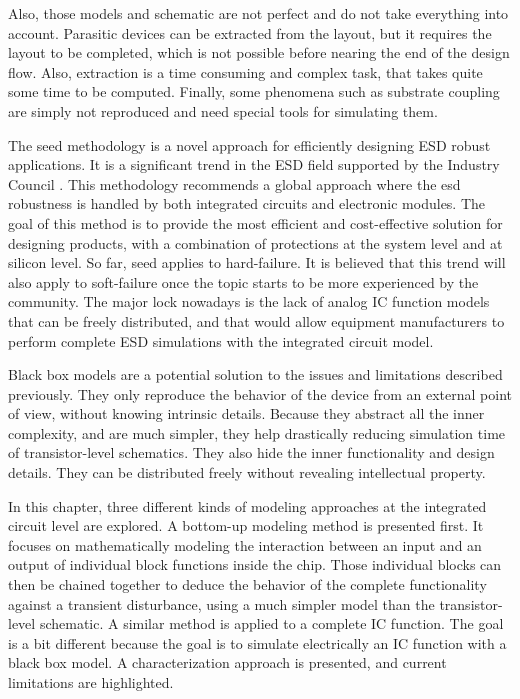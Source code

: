 Also, those models and schematic are not perfect and do not take everything into account.
Parasitic devices can be extracted from the layout, but it requires the layout to be completed, which is not possible before nearing the end of the design flow.
Also, extraction is a time consuming and complex task, that takes quite some time to be computed.
Finally, some phenomena such as substrate coupling are simply not reproduced and need special tools for simulating them.

The \gls{seed} methodology is a novel approach for efficiently designing ESD robust applications.
It is a significant trend in the ESD field supported by the Industry Council \cite{seed}.
This methodology recommends a global approach where the \gls{esd} robustness is handled by both integrated circuits and electronic modules.
The goal of this method is to provide the most efficient and cost-effective solution for designing products, with a combination of protections at the system level and at silicon level.
So far, \gls{seed} applies to hard-failure.
It is believed that this trend will also apply to soft-failure once the topic starts to be more experienced by the community.
The major lock nowadays is the lack of analog IC function models that can be freely distributed, and that would allow equipment manufacturers to perform complete ESD simulations with the integrated circuit model.

Black box models are a potential solution to the issues and limitations described previously.
They only reproduce the behavior of the device from an external point of view, without knowing intrinsic details.
Because they abstract all the inner complexity, and are much simpler, they help drastically reducing simulation time of transistor-level schematics.
They also hide the inner functionality and design details.
They can be distributed freely without revealing intellectual property.

In this chapter, three different kinds of modeling approaches at the integrated circuit level are explored.
A bottom-up modeling method is presented first.
It focuses on mathematically modeling the interaction between an input and an output of individual block functions inside the chip.
Those individual blocks can then be chained together to deduce the behavior of the complete functionality against a transient disturbance, using a much simpler model than the transistor-level schematic.
A similar method is applied to a complete IC function.
The goal is a bit different because the goal is to simulate electrically an IC function with a black box model.
A characterization approach is presented, and current limitations are highlighted.

